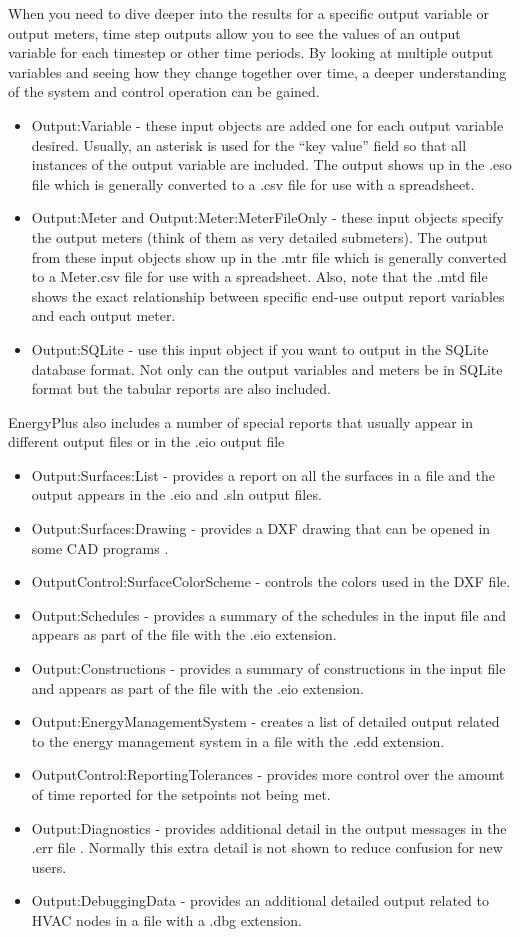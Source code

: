 When you need to dive deeper into the results for a specific output
variable or output meters, time step outputs allow you to see the
values of an output variable for each timestep or other time periods.
By looking at multiple output variables and seeing how they change
together over time, a deeper understanding of the system and control
operation can be gained.
\begin{itemize}
\item Output:Variable - these input objects are added one for each output
variable desired. Usually, an asterisk is used for the ``key value''
field so that all instances of the output variable are included. The
output shows up in the .eso file which is generally converted to a
.csv file for use with a spreadsheet.
\item Output:Meter and Output:Meter:MeterFileOnly - these input objects
specify the output meters (think of them as very detailed submeters).
The output from these input objects show up in the .mtr file which
is generally converted to a Meter.csv file for use with a spreadsheet.
Also, note that the .mtd file shows the exact relationship between
specific end-use output report variables and each output meter.
\item Output:SQLite - use this input object if you want to output in the
SQLite database format. Not only can the output variables and meters
be in SQLite format but the tabular reports are also included.
\end{itemize}
EnergyPlus also includes a number of special reports that usually
appear in different output files or in the .eio output file
\begin{itemize}
\item Output:Surfaces:List - provides a report on all the surfaces in a
file and the output appears in the .eio and .sln output files.
\item Output:Surfaces:Drawing - provides a DXF drawing that can be opened
in some CAD programs .
\item OutputControl:SurfaceColorScheme - controls the colors used in the
DXF file.
\item Output:Schedules - provides a summary of the schedules in the input
file and appears as part of the file with the .eio extension.
\item Output:Constructions - provides a summary of constructions in the
input file and appears as part of the file with the .eio extension.
\item Output:EnergyManagementSystem - creates a list of detailed output
related to the energy management system in a file with the .edd extension.
\item OutputControl:ReportingTolerances - provides more control over the
amount of time reported for the setpoints not being met.
\item Output:Diagnostics - provides additional detail in the output messages
in the .err file . Normally this extra detail is not shown to reduce
confusion for new users.
\item Output:DebuggingData - provides an additional detailed output related
to HVAC nodes in a file with a .dbg extension.
\end{itemize}
